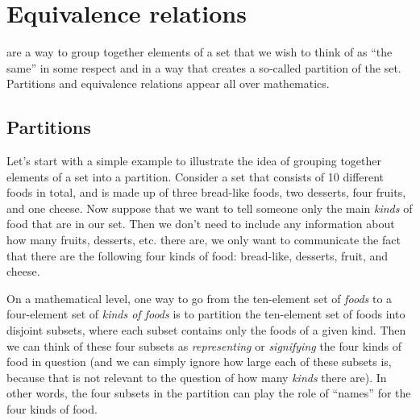 
\section{Equivalence relations}



 are a way to group together elements of a set that we wish to think of as ``the same'' in some respect and in a way that creates a so-called partition of the set.
Partitions and equivalence relations appear all over mathematics.

\subsection{Partitions}

\begin{marginfigure}
    \centering
    \caption{A set of foods.}
    \label{fig:set_of_foods}
\end{marginfigure}
Let's start with a simple example to illustrate the idea of grouping together elements of a set into a partition.
Consider a set that consists of 10 different foods in total, and is made up of three bread-like foods, two desserts, four fruits, and one cheese.
Now suppose that we want to tell someone only the main \emph{kinds} of food that are in our set.
Then we don't need to include any information about how many fruits, desserts, etc. there are, we only want to communicate the fact that there are the following four kinds of food: bread-like, desserts, fruit, and cheese.

\begin{marginfigure}
    \centering
    \caption{A partition of a set of foods.}
    \label{fig:partition_kinds_of_foods}
\end{marginfigure}

On a mathematical level, one way to go from the ten-element set of \emph{foods} to a four-element set of \emph{kinds of foods} is to partition the ten-element set of foods into disjoint subsets, where each subset contains only the foods of a given kind.
Then we can think of these four subsets as \emph{representing} or \emph{signifying} the four kinds of food in question (and we can simply ignore how large each of these subsets is, because that is not relevant to the question of how many \emph{kinds} there are).
In other words, the four subsets in the partition can play the role of ``names'' for the four kinds of food.


